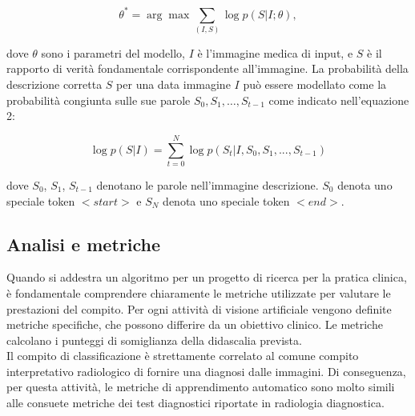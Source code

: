 \documentclass[12pt,a4paper]{report}
\begin{document}
\begin{equation}
{\displaystyle \theta^* =  \arg\max \sum\limits_{(I, S)} \log p(S | I; \theta)},
\end{equation}

dove $\theta$ sono i parametri del modello, $I$ è l'immagine medica di input, e $S$ è il rapporto di verità fondamentale corrispondente all'immagine. La probabilità della descrizione corretta $S$ per una data immagine $I$ può essere modellato come la probabilità congiunta sulle sue parole $S_0, S_1, … ,S_{t-1}$ come indicato nell'equazione 2:

\begin{equation}
{\displaystyle \log p(S|I) =  \sum\limits_{t = 0}^{N} \log p(S_t | I, S_0, S_1, ..., S_{t-1})}
\end{equation}

dove $S_0$, $S_1$, $S_{t-1}$ denotano le parole nell'immagine descrizione. $S_0$ denota uno speciale token $<start>$ e $S_N$ denota uno speciale token $<end>$.

\subsection{Analisi e metriche}
Quando si addestra un algoritmo per un progetto di ricerca per la pratica clinica, è fondamentale comprendere chiaramente le metriche utilizzate per valutare le prestazioni del compito. Per ogni attività di visione artificiale vengono definite metriche specifiche, che possono differire da un obiettivo clinico. Le metriche calcolano i punteggi di somiglianza della didascalia prevista.\\
Il compito di classificazione è strettamente correlato al comune compito interpretativo radiologico di fornire una diagnosi dalle immagini. Di conseguenza, per questa attività, le metriche di apprendimento automatico sono molto simili alle consuete metriche dei test diagnostici riportate in radiologia diagnostica.
\end{document}
